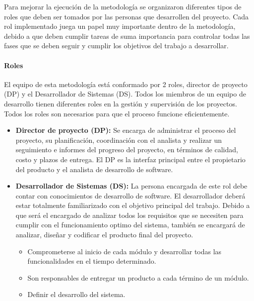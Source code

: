 Para mejorar la ejecución de la metodología se organizaron diferentes tipos de roles que deben ser tomados por las personas que desarrollen del proyecto. Cada rol implementado juega un papel muy importante dentro de la metodología, debido a que deben cumplir tareas de suma importancia para controlar todas las fases que se deben seguir y cumplir los objetivos del trabajo a desarrollar.

\paragraph{Roles}

El equipo de esta metodología está conformado por 2 roles, director de proyecto (DP) y el Desarrollador de Sistemas (DS). Todos los miembros de un equipo de desarrollo tienen diferentes roles en la gestión y supervisión de los proyectos. Todos los roles son necesarios para que el proceso funcione eficientemente.

\begin{itemize}
	\item \textbf{Director de proyecto (DP):} Se encarga de administrar el proceso del proyecto, su planificación, coordinación con el analista y realizar un seguimiento e informes del progreso del proyecto, en términos de calidad, costo y plazos de entrega. El DP es la interfaz principal entre el propietario del producto y el analista de desarrollo de software.
	
	\item \textbf{Desarrollador de Sistemas (DS):} La persona encargada de este rol debe contar con conocimientos de desarrollo de software. El desarrollador deberá estar totalmente familiarizado con el objetivo principal del trabajo. Debido a que será el encargado de analizar todos los requisitos que se necesiten para cumplir con el funcionamiento optimo del sistema, también se encargará de analizar, diseñar y codificar el producto final del proyecto.
	
	\begin{itemize}
		\item Comprometerse al inicio de cada módulo y desarrollar todas las funcionalidades en el tiempo determinado.
		
		\item Son responsables de entregar un producto a cada término de un módulo.
		
		\item Definir el desarrollo del sistema.
	\end{itemize} 
\end{itemize}

